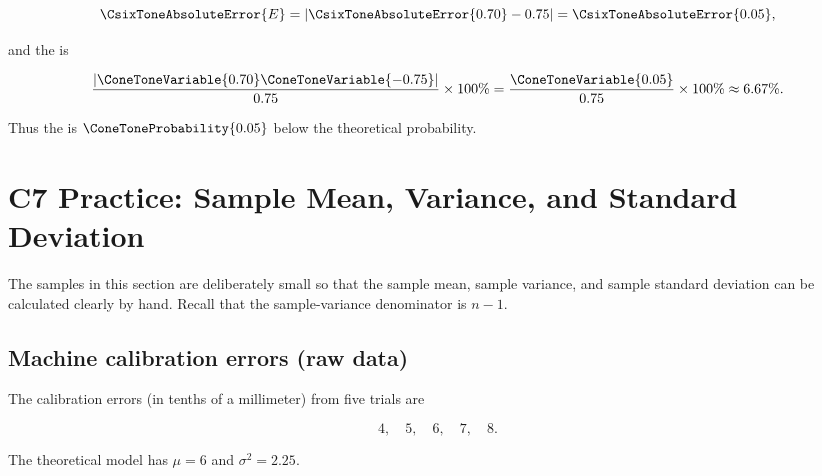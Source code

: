 \[
\CsixToneAbsoluteError{E}=|\CsixToneAbsoluteError{0.70}-0.75|=\CsixToneAbsoluteError{0.05},
\]

and the   is

\[
\frac{|\ConeToneVariable{0.70}\ConeToneVariable{-0.75}|}{0.75}\times100\%
=\frac{\ConeToneVariable{0.05}}{0.75}\times100\%\approx6.67\%.
\]

Thus the   is $\ConeToneProbability{0.05}$ below the theoretical probability.


\section{C7 Practice: Sample Mean, Variance, and Standard Deviation}
\label{sec:c7-only-practice}

\vspace{5mm}

The samples in this section are deliberately small so that the sample mean,
sample variance, and sample standard deviation can be calculated clearly by
hand. Recall that the sample-variance denominator is $n-1$.

\subsection{Machine calibration errors (raw data)}
\label{sec:c7-only-raw}

The calibration errors (in tenths of a millimeter) from five trials are

\[
4,\quad5,\quad6,\quad7,\quad8.
\]

The theoretical model has $\mu=6$ and $\sigma^2=2.25$.


